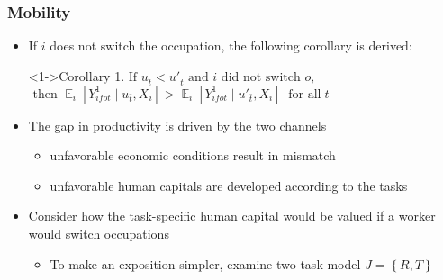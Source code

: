 \documentclass[11pt]{beamer}
\begin{document}
\begin{frame}
	\frametitle{Mobility}
	\begin{itemize}
		\item If $i$ does not switch the occupation, the following corollary is derived:
		\begin{block}<1->{Corollary 1.}
			$\text{If }u_{\bar{t}} < u'_{\bar{t}} \text{ and } i \text{ did not switch }o,$\\
			$\text{ then } \mathop{{}\mathbb{E}}_{i} \left[Y_{ifot}^1 \mid u_{\bar{t}}, X_i \right] > \mathop{{}\mathbb{E}}_{i} \left[Y_{ifot}^1 \mid u'_{\bar{t}}, X_i \right]\;\;\text{for all}\; t$
		\end{block}	
	\vspace{1 mm}
		\item The gap in productivity is driven by the two channels
		\begin{itemize}
			\item unfavorable economic conditions result in mismatch 
			\item unfavorable human capitals are developed according to the tasks 
		\end{itemize}
	\vspace{1 mm}
		\item Consider how the task-specific human capital would be valued if a worker would switch occupations
		\begin{itemize}
			\item To make an exposition simpler, examine two-task model $J = \left\lbrace R, T \right\rbrace $
		\end{itemize}
	\end{itemize}
\end{frame}
\end{document}
